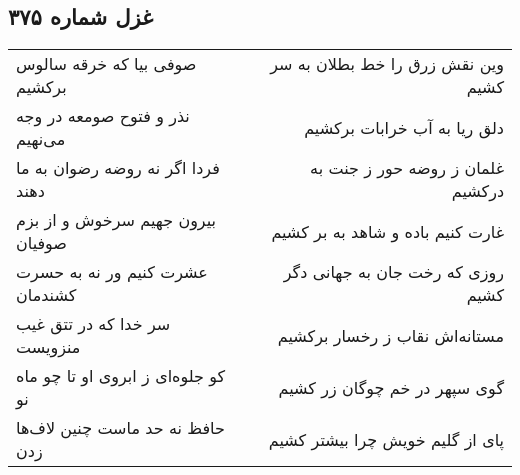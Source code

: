 \begin{center}
\section*{غزل شماره ۳۷۵}
\label{sec:sh375}
\begin{longtable}{l p{0.5cm} r}
صوفی بیا که خرقه سالوس برکشیم
&&
وین نقش زرق را خط بطلان به سر کشیم
\\
نذر و فتوح صومعه در وجه می‌نهیم
&&
دلق ریا به آب خرابات برکشیم
\\
فردا اگر نه روضه رضوان به ما دهند
&&
غلمان ز روضه حور ز جنت به درکشیم
\\
بیرون جهیم سرخوش و از بزم صوفیان
&&
غارت کنیم باده و شاهد به بر کشیم
\\
عشرت کنیم ور نه به حسرت کشندمان
&&
روزی که رخت جان به جهانی دگر کشیم
\\
سر خدا که در تتق غیب منزویست
&&
مستانه‌اش نقاب ز رخسار برکشیم
\\
کو جلوه‌ای ز ابروی او تا چو ماه نو
&&
گوی سپهر در خم چوگان زر کشیم
\\
حافظ نه حد ماست چنین لاف‌ها زدن
&&
پای از گلیم خویش چرا بیشتر کشیم
\\
\end{longtable}
\end{center}

